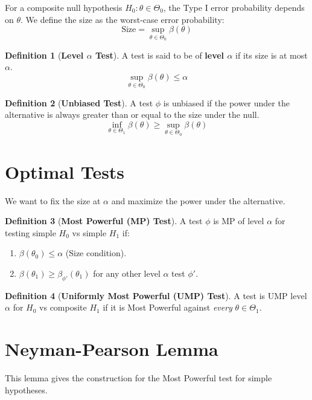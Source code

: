 \documentclass[12pt, a4paper]{article}
\theoremstyle{definition}
\newtheorem{definition}{Definition}
\begin{document}
For a composite null hypothesis $H_0: \theta \in \Theta_0$, the Type I error probability depends on $\theta$. We define the size as the worst-case error probability:
$$ \text{Size} = \sup_{\theta \in \Theta_0} \beta(\theta) $$

\begin{definition}[\textbf{Level $\alpha$ Test}]
A test is said to be of \textbf{level $\alpha$} if its size is at most $\alpha$.
$$ \sup_{\theta \in \Theta_0} \beta(\theta) \le \alpha $$
\end{definition}

\begin{definition}[\textbf{Unbiased Test}]
A test $\phi$ is unbiased if the power under the alternative is always greater than or equal to the size under the null.
$$ \inf_{\theta \in \Theta_1} \beta(\theta) \ge \sup_{\theta \in \Theta_0} \beta(\theta) $$
\end{definition}

\section{Optimal Tests}

We want to fix the size at $\alpha$ and maximize the power under the alternative.

\begin{definition}[\textbf{Most Powerful (MP) Test}]
A test $\phi$ is MP of level $\alpha$ for testing simple $H_0$ vs simple $H_1$ if:
\begin{enumerate}
    \item $\beta(\theta_0) \le \alpha$ (Size condition).
    \item $\beta(\theta_1) \ge \beta_{\phi'}(\theta_1)$ for any other level $\alpha$ test $\phi'$.
\end{enumerate}
\end{definition}

\begin{definition}[\textbf{Uniformly Most Powerful (UMP) Test}]
A test is UMP level $\alpha$ for $H_0$ vs composite $H_1$ if it is Most Powerful against \textit{every} $\theta \in \Theta_1$.
\end{definition}

\section{Neyman-Pearson Lemma}

This lemma gives the construction for the Most Powerful test for simple hypotheses.
\end{document}
